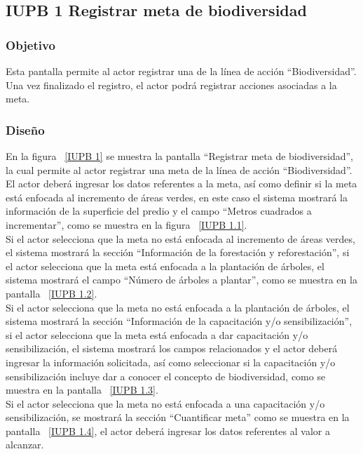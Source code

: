 \subsection{IUPB 1 Registrar meta de biodiversidad}
                     
\subsubsection{Objetivo}

   Esta pantalla permite al actor registrar una  de la línea de acción ``Biodiversidad''. Una vez finalizado el registro, el actor podrá registrar acciones asociadas a la meta.

	
\subsubsection{Diseño}

  En la figura ~\ref{IUPB 1} se muestra la pantalla ``Registrar meta de biodiversidad'',
  la cual permite al actor registrar una meta de la línea de acción ``Biodiversidad''. 
  El actor deberá ingresar los datos referentes a la meta, así como definir si la meta está enfocada al incremento de áreas verdes, 
  en este caso el sistema mostrará la información de la superficie del predio y el campo ``Metros cuadrados a incrementar'', como se muestra en la figura ~\ref{IUPB 1.1}.\\
  
  Si el actor selecciona que la meta no está enfocada al incremento de áreas verdes, el sistema mostrará la sección ``Información de la forestación y reforestación'',
  si el actor selecciona que la meta está enfocada a la plantación de árboles, el sistema mostrará el campo ``Número de árboles a plantar'', como se muestra en la pantalla ~\ref{IUPB 1.2}.\\
  
    
  Si el actor selecciona que la meta no está enfocada a la plantación de árboles, el sistema mostrará la sección ``Información de la capacitación y/o sensibilización'',
  si el actor selecciona que la meta está enfocada a dar capacitación y/o sensibilización, el sistema mostrará los campos relacionados y
  el actor deberá ingresar la información solicitada, así como seleccionar si la capacitación y/o sensibilización incluye dar a conocer
  el concepto de biodiversidad, como se muestra en la pantalla ~\ref{IUPB 1.3}.\\
    
  Si el actor selecciona que la meta no está enfocada a una capacitación y/o sensibilización, se mostrará la sección ``Cuantificar meta'' como se muestra en la pantalla ~\ref{IUPB 1.4}, el actor 
  deberá ingresar los datos referentes al valor a alcanzar.\\
 
